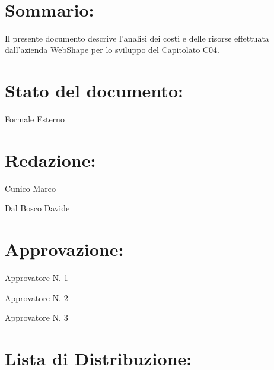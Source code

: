 \newpage

\begin{center} %
	\begin{Huge}	
				\textbf{\TITOLODOC}
			\\
	\end{Huge}
\end{center}

\section*{\Large Sommario:}
Il presente documento descrive l'analisi dei costi e delle risorse effettuata dall'azienda WebShape per lo sviluppo del Capitolato C04.

\indent \indent

\section*{\Large Stato del documento:}
\indent \indent
	Formale Esterno

\section*{\Large Redazione:}
	\begin{elencopuntato}[\normindent]
		\item Cunico Marco
		\item Dal Bosco Davide
	\end{elencopuntato}

\section*{\Large Approvazione:}
	\begin{elencopuntato}[\normindent]
		\item Approvatore N. 1
		\item Approvatore N. 2
		\item Approvatore N. 3
	\end{elencopuntato}

\section*{\LARGE Lista di Distribuzione:}

